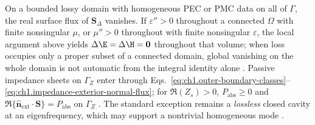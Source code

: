 On a bounded lossy domain with homogeneous PEC or PMC data on all of $\Gamma$, the real surface flux of $\mathbf{S}_\Delta$ vanishes. If $\varepsilon''>0$ throughout a connected $\Omega$ with finite nonsingular $\mu$, or $\mu''>0$ throughout with finite nonsingular $\varepsilon$, the local argument above yields $\Delta\E=\Delta\H=\mathbf{0}$ throughout that volume; when loss occupies only a proper subset of a connected domain, global vanishing on the whole domain is not automatic from the integral identity alone \cite{stratton1941}. Passive impedance sheets on $\Gamma_Z$ enter through Eqs.~\eqref{eq:ch1.outer-boundary-classes}--\eqref{eq:ch1.impedance-exterior-normal-flux}; for $\Re(Z_s)>0$, $P_{\mathrm{abs}}\ge0$ and $\Re\{\hat{\mathbf{n}}_{\mathrm{ext}}\cdot\mathbf{S}\}=P_{\mathrm{abs}}$ on $\Gamma_Z$ \cite{stratton1941,harrington2001}. The standard exception remains a \emph{lossless} closed cavity at an eigenfrequency, which may support a nontrivial homogeneous mode \cite{stratton1941,sommerfeld1949}.

